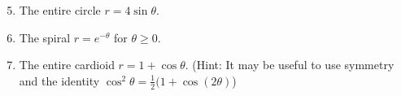 \documentclass[12pt]{article}
\newif\ifans
\begin{document}

\begin{enumerate}
\setcounter{enumi}{4}

\item The entire circle $r=4\sin{\theta}$.

\ifans{\fbox{$4\pi$}} \fi

\item The spiral $r=e^{-\theta}$ for $\theta \geq 0$.

\ifans{\fbox{$\sqrt{2}$}} \fi

\item The entire cardioid $r=1+\cos{\theta}$. (Hint: It may be useful to use symmetry and the identity $\cos^2{\theta}=\frac{1}{2}(1+\cos{(2\theta)}$)

\ifans{\fbox{8}} \fi

\end{enumerate}

\end{document}
